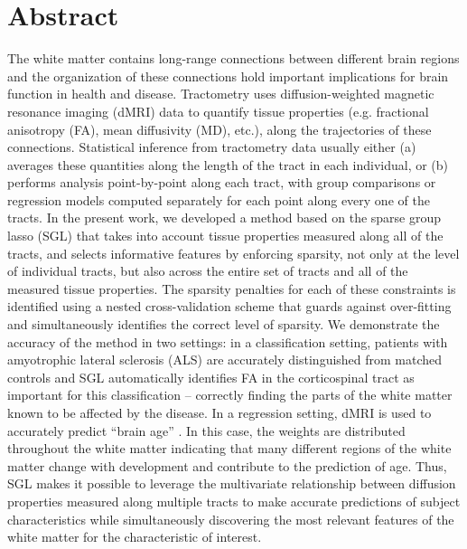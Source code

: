 \section*{Abstract}

The white matter contains long-range connections between different
brain regions and the organization of these connections hold important
implications for brain function in health and disease. Tractometry
uses diffusion-weighted magnetic resonance imaging (dMRI) data
to quantify tissue properties (e.g. fractional anisotropy (FA),
mean diffusivity (MD), etc.), along the trajectories of these
connections\cite{yeatman2012tract}. Statistical inference from
tractometry data usually either (a) averages these quantities along
the length of the tract in each individual, or (b) performs analysis
point-by-point along each tract, with group comparisons or regression
models computed separately for each point along every one of the tracts.
In the present work, we developed a method based on the sparse group
lasso (SGL) \cite{simon2013sparse} that takes into account tissue
properties measured along all of the tracts, and selects informative
features by enforcing sparsity, not only at the level of individual
tracts, but also across the entire set of tracts and all of the measured
tissue properties. The sparsity penalties for each of these constraints
is identified using a nested cross-validation scheme that guards
against over-fitting and simultaneously identifies the correct
level of sparsity. We demonstrate the accuracy of the method in two
settings: in a classification setting, patients with amyotrophic
lateral sclerosis (ALS) are accurately distinguished from matched
controls\cite{sarica2017corticospinal} and SGL automatically identifies
FA in the corticospinal tract as important for this classification --
correctly finding the parts of the white matter known to be affected
by the disease. In a regression setting, dMRI is used to accurately
predict ``brain age'' \cite{yeatman2014lifespan, Brown2012-so}. In this
case, the weights are distributed throughout the white matter indicating
that many different regions of the white matter change with development
and contribute to the prediction of age. Thus, SGL makes it possible
to leverage the multivariate relationship between diffusion properties
measured along multiple tracts to make accurate predictions of subject
characteristics while simultaneously discovering the most relevant
features of the white matter for the characteristic of interest.
